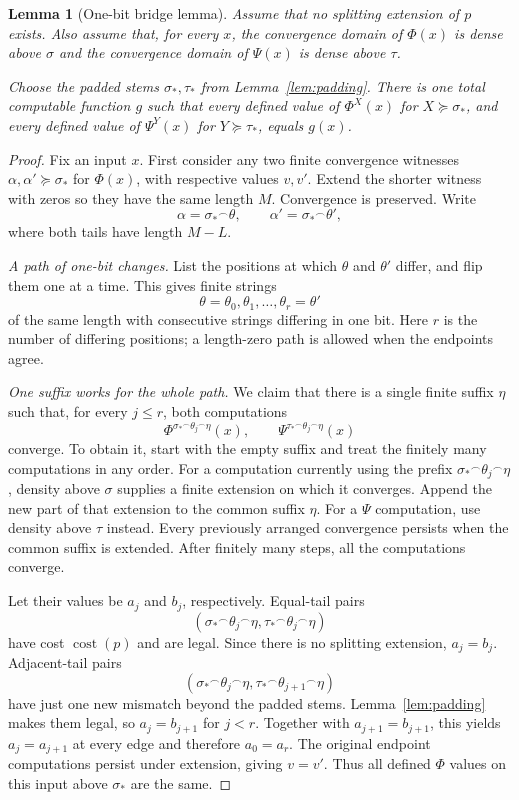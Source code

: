 \documentclass[11pt,a4paper]{article}
\newcommand{\cost}{\operatorname{cost}}
\newcommand{\concat}{\mathbin{{}^{\frown}}}
\newtheorem{lemma}[theorem]{Lemma}
\theoremstyle{definition}
\theoremstyle{remark}
\begin{document}
\begin{lemma}[One-bit bridge lemma]\label{lem:bridge}
Assume that no splitting extension of $p$ exists. Also assume that, for every $x$, the convergence domain of $\Phi(x)$ is dense above $\sigma$ and the convergence domain of $\Psi(x)$ is dense above $\tau$.

Choose the padded stems $\sigma_*,\tau_*$ from Lemma~\ref{lem:padding}. There is one total computable function $g$ such that every defined value of $\Phi^X(x)$ for $X\succeq\sigma_*$, and every defined value of $\Psi^Y(x)$ for $Y\succeq\tau_*$, equals $g(x)$.
\end{lemma}
\begin{proof}
Fix an input $x$. First consider any two finite convergence witnesses $\alpha,\alpha'\succeq\sigma_*$ for $\Phi(x)$, with respective values $v,v'$. Extend the shorter witness with zeros so they have the same length $M$. Convergence is preserved. Write
\[
\alpha=\sigma_*\concat\theta,\qquad
\alpha'=\sigma_*\concat\theta',
\]
where both tails have length $M-L$.

\textit{A path of one-bit changes.}
List the positions at which $\theta$ and $\theta'$ differ, and flip them one at a time. This gives finite strings
\[
\theta=\theta_0,\theta_1,\ldots,\theta_r=\theta'
\]
of the same length with consecutive strings differing in one bit. Here $r$ is the number of differing positions; a length-zero path is allowed when the endpoints agree.

\textit{One suffix works for the whole path.}
We claim that there is a single finite suffix $\eta$ such that, for every $j\leq r$, both computations
\begin{equation}\label{eq:synchronized}
\Phi^{\sigma_*\concat\theta_j\concat\eta}(x),
\qquad
\Psi^{\tau_*\concat\theta_j\concat\eta}(x)
\end{equation}
converge. To obtain it, start with the empty suffix and treat the finitely many computations in any order. For a computation currently using the prefix $\sigma_*\concat\theta_j\concat\eta$, density above $\sigma$ supplies a finite extension on which it converges. Append the new part of that extension to the common suffix $\eta$. For a $\Psi$ computation, use density above $\tau$ instead. Every previously arranged convergence persists when the common suffix is extended. After finitely many steps, all the computations converge.

Let their values be $a_j$ and $b_j$, respectively. Equal-tail pairs
\[
(\sigma_*\concat\theta_j\concat\eta,
 \tau_*\concat\theta_j\concat\eta)
\]
have cost $\cost(p)$ and are legal. Since there is no splitting extension, $a_j=b_j$. Adjacent-tail pairs
\[
(\sigma_*\concat\theta_j\concat\eta,
 \tau_*\concat\theta_{j+1}\concat\eta)
\]
have just one new mismatch beyond the padded stems. Lemma~\ref{lem:padding} makes them legal, so $a_j=b_{j+1}$ for $j<r$. Together with $a_{j+1}=b_{j+1}$, this yields $a_j=a_{j+1}$ at every edge and therefore $a_0=a_r$. The original endpoint computations persist under extension, giving $v=v'$. Thus all defined $\Phi$ values on this input above $\sigma_*$ are the same.


\end{proof}
\end{document}
